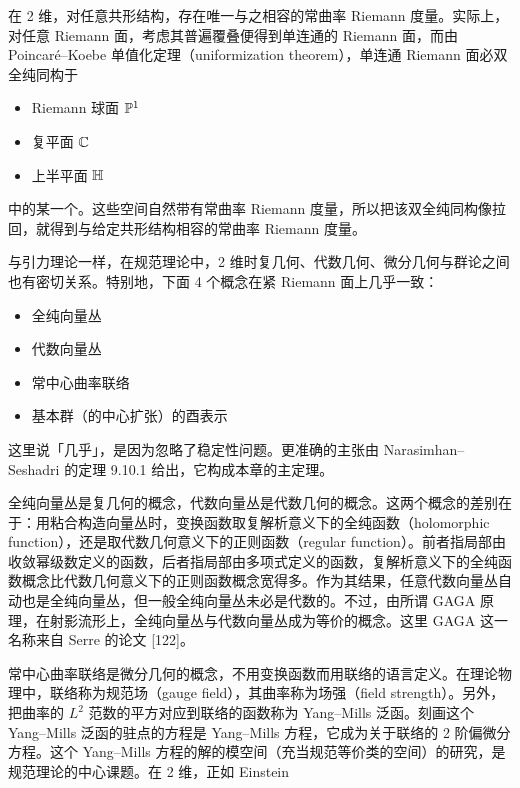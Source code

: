 
在 2 维，对任意共形结构，存在唯一与之相容的常曲率 Riemann 度量。实际上，对任意 Riemann 面，考虑其普遍覆叠便得到单连通的 Riemann 面，而由 Poincaré--Koebe 单值化定理（uniformization theorem），单连通 Riemann 面必双全纯同构于
\begin{itemize}
  \item Riemann 球面 $\mathbb{P}^1$
  \item 复平面 $\mathbb{C}$
  \item 上半平面 $\mathbb{H}$
\end{itemize}
中的某一个。这些空间自然带有常曲率 Riemann 度量，所以把该双全纯同构像拉回，就得到与给定共形结构相容的常曲率 Riemann 度量。

与引力理论一样，在规范理论中，2 维时复几何、代数几何、微分几何与群论之间也有密切关系。特别地，下面 4 个概念在紧 Riemann 面上几乎一致：
\begin{itemize}
  \item 全纯向量丛
  \item 代数向量丛
  \item 常中心曲率联络
  \item 基本群（的中心扩张）的酉表示
\end{itemize}
这里说「几乎」，是因为忽略了稳定性问题。更准确的主张由 Narasimhan--Seshadri 的定理 9.10.1 给出，它构成本章的主定理。


全纯向量丛是复几何的概念，代数向量丛是代数几何的概念。这两个概念的差别在于：用粘合构造向量丛时，变换函数取复解析意义下的全纯函数（holomorphic function），还是取代数几何意义下的正则函数（regular function）。前者指局部由收敛幂级数定义的函数，后者指局部由多项式定义的函数，复解析意义下的全纯函数概念比代数几何意义下的正则函数概念宽得多。作为其结果，任意代数向量丛自动也是全纯向量丛，但一般全纯向量丛未必是代数的。不过，由所谓 GAGA 原理，在射影流形上，全纯向量丛与代数向量丛成为等价的概念。这里 GAGA 这一名称来自 Serre 的论文 [122]。


常中心曲率联络是微分几何的概念，不用变换函数而用联络的语言定义。在理论物理中，联络称为规范场（gauge field），其曲率称为场强（field strength）。另外，把曲率的 $L^2$ 范数的平方对应到联络的函数称为 Yang--Mills 泛函。刻画这个 Yang--Mills 泛函的驻点的方程是 Yang--Mills 方程，它成为关于联络的 2 阶偏微分方程。这个 Yang--Mills 方程的解的模空间（充当规范等价类的空间）的研究，是规范理论的中心课题。在 2 维，正如 Einstein

